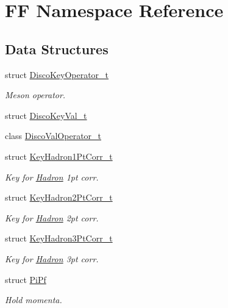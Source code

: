 \hypertarget{namespaceFF}{}\section{FF Namespace Reference}
\label{namespaceFF}
\subsection*{Data Structures}
\begin{DoxyCompactItemize}
\item 
struct \mbox{\hyperlink{structFF_1_1DiscoKeyOperator__t}{Disco\+Key\+Operator\+\_\+t}}
\begin{DoxyCompactList}\small\item\em Meson operator. \end{DoxyCompactList}\item 
struct \mbox{\hyperlink{structFF_1_1DiscoKeyVal__t}{Disco\+Key\+Val\+\_\+t}}
\item 
class \mbox{\hyperlink{classFF_1_1DiscoValOperator__t}{Disco\+Val\+Operator\+\_\+t}}
\item 
struct \mbox{\hyperlink{structFF_1_1KeyHadron1PtCorr__t}{Key\+Hadron1\+Pt\+Corr\+\_\+t}}
\begin{DoxyCompactList}\small\item\em Key for \mbox{\hyperlink{namespaceHadron}{Hadron}} 1pt corr. \end{DoxyCompactList}\item 
struct \mbox{\hyperlink{structFF_1_1KeyHadron2PtCorr__t}{Key\+Hadron2\+Pt\+Corr\+\_\+t}}
\begin{DoxyCompactList}\small\item\em Key for \mbox{\hyperlink{namespaceHadron}{Hadron}} 2pt corr. \end{DoxyCompactList}\item 
struct \mbox{\hyperlink{structFF_1_1KeyHadron3PtCorr__t}{Key\+Hadron3\+Pt\+Corr\+\_\+t}}
\begin{DoxyCompactList}\small\item\em Key for \mbox{\hyperlink{namespaceHadron}{Hadron}} 3pt corr. \end{DoxyCompactList}\item 
struct \mbox{\hyperlink{structFF_1_1PiPf}{Pi\+Pf}}
\begin{DoxyCompactList}\small\item\em Hold momenta. \end{DoxyCompactList}\end{DoxyCompactItemize}
